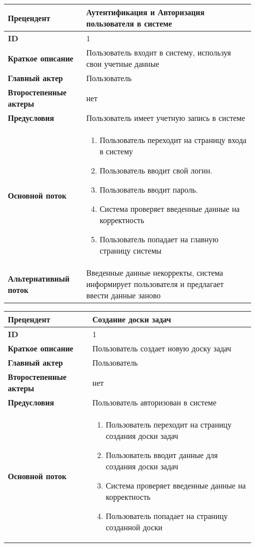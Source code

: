 \documentclass{article}
\begin{document}
\begin{center}
\begin{tabular}{|l|p{9cm}|}
  \hline
  \textbf{Прецендент} & Аутентификация и Авторизация пользователя в системе \\
  \hline
  \textbf{ID} & 1 \\
  \hline
  \textbf{Краткое описание} & Пользователь входит в систему, используя свои учетные данные \\
  \hline
  \textbf{Главный актер} & Пользователь\\
  \hline
  \textbf{Второстепенные актеры} & нет \\
  \hline
  \textbf{Предусловия} &  Пользователь имеет учетную запись в системе\\
  \hline
  \textbf{Основной поток} & \begin{enumerate}
    \item Пользователь переходит на страницу входа в систему
    \item Пользователь вводит свой логин.
    \item Пользователь вводит пароль.
    \item Система проверяет введенные данные на корректность
    \item Пользователь попадает на главную страницу системы
  \end{enumerate} \\
  \hline
  \textbf{Альтернативный поток} & Введенные данные некорректы, система информирует пользователя и предлагает ввести данные заново\\
  \hline
  \hline
\end{tabular}

\begin{tabular}{|l|p{9cm}|}
  \hline
  \textbf{Прецендент} & Создание доски задач  \\
  \hline
  \textbf{ID} & 1 \\
  \hline
  \textbf{Краткое описание} & Пользователь создает новую доску задач \\
  \hline
  \textbf{Главный актер} & Пользователь\\
  \hline
  \textbf{Второстепенные актеры} & нет \\
  \hline
  \textbf{Предусловия} &  Пользователь авторизован в системе\\
  \hline
  \textbf{Основной поток} & \begin{enumerate}
    \item Пользователь переходит на страницу создания доски задач
    \item Пользователь вводит данные для создания доски задач
    \item Система проверяет введенные данные на корректность
    \item Пользователь попадает на страницу созданной доски
  \end{enumerate} \\
  \hline
\end{tabular}


\end{center}
\end{document}
